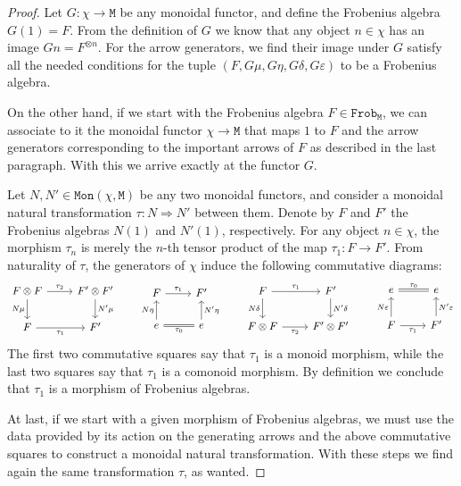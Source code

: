 \documentclass[11pt, reqno]{amsart}
\theoremstyle{definition}
\newcommand{\nat}{\Rightarrow}
\newcommand{\cat}{\texttt}
\newcommand{\catfont}{\texttt}
\newcommand{\Mon}{{\catfont{Mon}}}          %
\newcommand{\Frob}{{\catfont{Frob}}} %
\begin{document}
\begin{proof}
Let \(G: \chi \to \cat M\) be any monoidal functor, and define the Frobenius
algebra \(G(1) = F\). From the definition of \(G\) we know that any object
\(n \in \chi\) has an image \(G n = F^{\otimes n}\). For the arrow generators,
we find their image under \(G\) satisfy all the needed conditions for the tuple
\((F, G \mu, G \eta, G \delta, G \varepsilon)\) to be a Frobenius algebra.

On the other hand, if we start with the Frobenius algebra
\(F \in \Frob_{\cat M}\), we can associate to it the monoidal functor
\(\chi \to \cat M\) that maps \(1\) to \(F\) and the arrow generators
corresponding to the important arrows of \(F\) as described in the last
paragraph. With this we arrive exactly at the functor \(G\).

Let \(N, N' \in \Mon(\chi, \cat M)\) be any two monoidal functors, and consider a
monoidal natural transformation \(\tau: N \nat N'\) between them. Denote by
\(F\) and \(F'\) the Frobenius algebras \(N(1)\) and \(N'(1)\), respectively. For
any object \(n \in \chi\), the morphism \(\tau_n\) is merely the \(n\)-th tensor
product of the map \(\tau_1: F \to F'\). From naturality of \(\tau\), the
generators of \(\chi\) induce the following commutative diagrams:
\[
\begin{tikzcd}
{F \otimes F} \ar[r, "\tau_2"] \ar[d, "N \mu"']
&{F' \otimes F'} \ar[d, "N' \mu"]
\\
{F} \ar[r, "\tau_1"']
&{F'}
\end{tikzcd}
%
\qquad
%
\begin{tikzcd}
F \ar[r, "\tau_1"]
&F'
\\
e \ar[u, "N \eta"] \ar[r, equal, "\tau_0"']
&e \ar[u, "N' \eta"']
\end{tikzcd}
%
\qquad
%
\begin{tikzcd}
F \ar[r, "\tau_1"] \ar[d, "N \delta"']
&F' \ar[d, "N' \delta"]
\\
F \otimes F \ar[r, "\tau_2"']
&F' \otimes F'
\end{tikzcd}
%
\qquad
%
\begin{tikzcd}
e \ar[r, equal, "\tau_0"]
&e
\\
F \ar[u, "N \varepsilon"] \ar[r, "\tau_1"']
&F' \ar[u, "N' \varepsilon"']
\end{tikzcd}
\]
The first two commutative squares say that \(\tau_1\) is a monoid morphism,
while the last two squares say that \(\tau_1\) is a comonoid morphism. By
definition we conclude that \(\tau_1\) is a morphism of Frobenius algebras.

At last, if we start with a given morphism of Frobenius algebras, we must use
the data provided by its action on the generating arrows and the above
commutative squares to construct a monoidal natural transformation. With these
steps we find again the same transformation \(\tau\), as wanted.
\end{proof}
\end{document}
